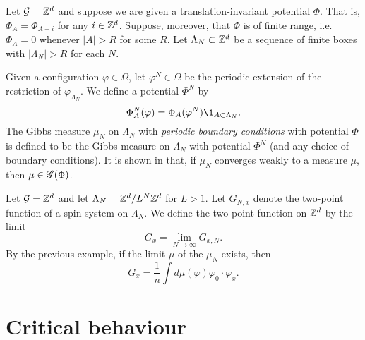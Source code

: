 \begin{example}
Let $\mathcal{G} = { {{\mathbb Z}}^d }$ and suppose we are given a translation-invariant potential $\Phi$.
That is, $\Phi_A = \Phi_{A + i}$ for any $i \in { {{\mathbb Z}}^d }$.
Suppose, moreover, that $\Phi$ is of finite range, i.e.\ $\Phi_A = 0$ whenever
$|A| > R$ for some $R$. Let $\Lambda_N \subset { {{\mathbb Z}}^d }$ be a sequence of finite boxes
with $|\Lambda_N| > R$ for each $N$.

Given a configuration $\varphi \in \Omega$, let $\varphi^N \in \Omega$
be the periodic extension of the restriction of $\varphi_{\Lambda_N}$.
We define a potential $\Phi^N$ by
\begin{equation}
\Phi^N_A(\varphi) = \Phi_A(\varphi^N) \1_{A \subset \Lambda_N}.
\end{equation}
The Gibbs measure $\mu_N$ on $\Lambda_N$ with \emph{periodic boundary conditions}
with potential $\Phi$ is defined to be the Gibbs measure on $\Lambda_N$ with
potential $\Phi^N$ (and any choice of boundary conditions).
It is shown in \cite[Example 4.20]{Georgii11} that, if $\mu_N$ converges weakly to a
measure $\mu$, then $\mu \in \mathscr{G}(\Phi)$.
\end{example}

\begin{example}
Let $\mathcal{G} = { {{\mathbb Z}}^d }$ and let $\Lambda_N = { {{\mathbb Z}}^d }/L^N{ {{\mathbb Z}}^d }$ for $L > 1$.
Let $G_{N,x}$ denote the two-point function of a spin system on $\Lambda_N$.
We define the two-point function on ${ {{\mathbb Z}}^d }$ by the limit
\begin{equation}
G_x = \lim_{N\to\infty} G_{x,N}.
\end{equation}
By the previous example, if the limit $\mu$ of the $\mu_N$ exists, then
\begin{equation}
G_x = \frac{1}{n} \int d\mu(\varphi) \varphi_0 \cdot \varphi_x.
\end{equation}
\end{example}



\section{Critical behaviour}

